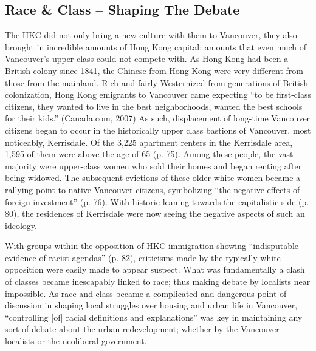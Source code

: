 \documentclass[man,donotrepeattitle,letter]{apa6}
\begin{document}
\subsection{Race \& Class -- Shaping The Debate}
The HKC did not only bring a new culture with them to Vancouver, they also brought in incredible amounts of Hong Kong capital; amounts that even much of Vancouver's upper class could not compete with. As Hong Kong had been a British colony since 1841, the Chinese from Hong Kong were very different from those from the mainland. Rich and fairly Westernized from generations of British colonization, Hong Kong emigrants to Vancouver came expecting ``to be first-class citizens, they wanted to live in the best neighborhoods, wanted the best schools for their kids.'' (Canada.com, 2007) As such, displacement of long-time Vancouver citizens began to occur in the historically upper class bastions of Vancouver, most noticeably, Kerrisdale. Of the 3,225 apartment renters in the Kerrisdale area, 1,595 of them were above the age of 65 (p. 75). Among these people, the vast majority were upper-class women who sold their homes and began renting after being widowed. The subsequent evictions of these older white women became a rallying point to native Vancouver citizens, symbolizing ``the negative effects of foreign investment'' (p. 76). With historic leaning towards the capitalistic side (p. 80), the residences of Kerrisdale were now seeing the negative aspects of such an ideology.

With groups within the opposition of HKC immigration showing ``indisputable evidence of racist agendas'' (p. 82), criticisms made by the typically white opposition were easily made to appear suspect.  What was fundamentally a clash of classes became inescapably linked to race; thus making debate by localists near impossible. As race and class became a complicated and dangerous point of discussion in shaping local struggles over housing and urban life in Vancouver, ``controlling [of] racial definitions and explanations'' was key in maintaining any sort of debate about the urban redevelopment; whether by the Vancouver localists or the neoliberal government.



\nocite{*}
\printbibliography

\end{document}
